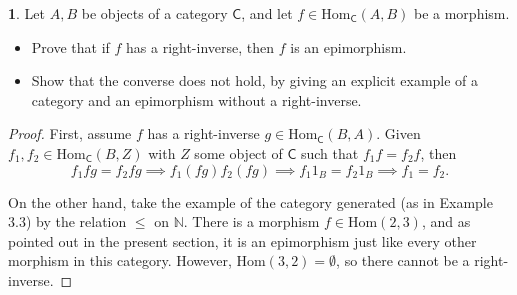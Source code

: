 \documentclass{article}
\theoremstyle{definition}
\newtheorem{ex}{}[section]
\begin{document}
\begin{ex}
	Let $A, B$ be objects of a category $\mathsf{C}$, and let $f \in \mathrm{Hom}_{\mathsf{C}}(A, B)$ be a morphism.
	\begin{itemize}
		\item Prove that if $f$ has a right-inverse, then $f$ is an epimorphism.
		\item Show that the converse does not hold, by giving an explicit example of a category and an epimorphism without a right-inverse.
	\end{itemize}
\end{ex}
\begin{proof}
	First, assume $f$ has a right-inverse $g \in \mathrm{Hom}_{\mathsf{C}}(B, A)$.
	Given $f_1, f_2 \in \mathrm{Hom}_{\mathsf{C}}(B, Z)$ with $Z$ some object of $\mathsf{C}$ such that $f_1 f = f_2 f$, then \begin{equation*}
		f_1 f g = f_2 f g \implies f_1 (f g) f_2 (f g) \implies f_1 1_B = f_2 1_B \implies f_1 = f_2.
	\end{equation*}

	On the other hand, take the example of the category generated (as in Example 3.3) by the relation $\leq$ on $\mathbb{N}$.
	There is a morphism $f \in \mathrm{Hom}(2, 3)$, and as pointed out in the present section, it is an epimorphism just like every other morphism in this category.
	However, $\mathrm{Hom}(3, 2) = \emptyset$, so there cannot be a right-inverse.
\end{proof}
\end{document}
